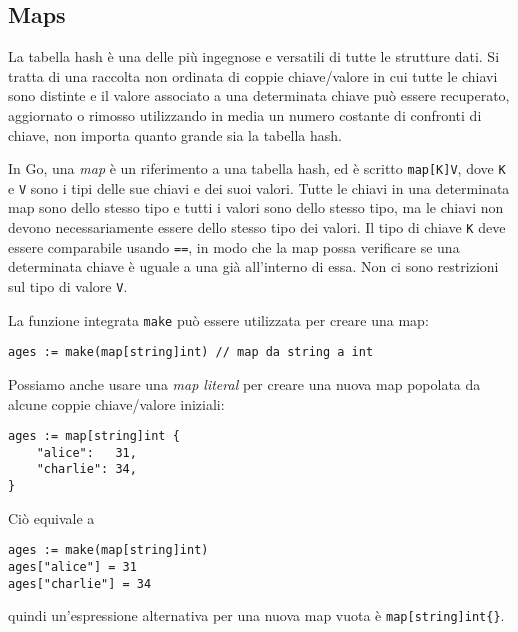 \documentclass[../../thesis.tex]{subfiles}
\begin{document}
    \subsection{Maps}\label{subsec:maps}
    La tabella hash è una delle più ingegnose e versatili di tutte le strutture dati.
    Si tratta di una raccolta non ordinata di coppie chiave/valore in cui tutte le chiavi sono distinte e il valore associato a una determinata chiave può essere recuperato, aggiornato o rimosso utilizzando in media un numero costante di confronti di chiave, non importa quanto grande sia la tabella hash.
    \hfill \vspace{12pt}

    In Go, una \textit{map} è un riferimento a una tabella hash, ed è scritto \verb"map[K]V", dove \verb"K" e \verb"V" sono i tipi delle sue chiavi e dei suoi valori.
    Tutte le chiavi in una determinata map sono dello stesso tipo e tutti i valori sono dello stesso tipo, ma le chiavi non devono necessariamente essere dello stesso tipo dei valori.
    Il tipo di chiave \verb"K" deve essere comparabile usando \verb"==", in modo che la map possa verificare se una determinata chiave è uguale a una già all'interno di essa.
    Non ci sono restrizioni sul tipo di valore \verb"V".
    \hfill \vspace{12pt}

    La funzione integrata \verb"make" può essere utilizzata per creare una map:
    \begin{lstlisting}[label={lst:lstlisting3-3.1}]
ages := make(map[string]int) // map da string a int
    \end{lstlisting}
    Possiamo anche usare una \textit{map literal} per creare una nuova map popolata da alcune coppie chiave/valore iniziali:
    \begin{lstlisting}[frame = single,label={lst:lstlisting3-3.2}]
ages := map[string]int {
    "alice":   31,
    "charlie": 34,
}
    \end{lstlisting}
    Ciò equivale a
    \begin{lstlisting}[frame = single,label={lst:lstlisting3-3.3}]
ages := make(map[string]int)
ages["alice"] = 31
ages["charlie"] = 34
    \end{lstlisting}
    quindi un'espressione alternativa per una nuova map vuota è \verb"map[string]int{}".
    \hfill \vspace{12pt}
\end{document}
